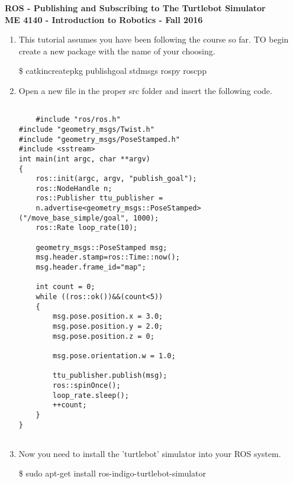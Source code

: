 \documentclass[12pt]{article}
\begin{document}
\thispagestyle{plain}

\begin{center}
   {\bf \Large ROS - Publishing and Subscribing to The Turtlebot Simulator}\vspace{2mm} \\
   {\bf \large ME 4140 - Introduction to Robotics - Fall 2016} \\
\end{center}


\begin{enumerate}
	
	\item This tutorial assumes you have been following the course so far. TO begin create a new package with the name of your choosing.


		{\selectfont  \hspace{5mm} \$ catkin\textunderscore create\textunderscore pkg publish\textunderscore goal std\textunderscore msgs rospy roscpp }
    

	\item Open a new file in the proper src folder and insert the following code. 

     	\begin{lstlisting}

	#include "ros/ros.h"
#include "geometry_msgs/Twist.h"
#include "geometry_msgs/PoseStamped.h"
#include <sstream>
int main(int argc, char **argv)
{
	ros::init(argc, argv, "publish_goal");
	ros::NodeHandle n;
	ros::Publisher ttu_publisher =
	n.advertise<geometry_msgs::PoseStamped>("/move_base_simple/goal", 1000);
	ros::Rate loop_rate(10);

	geometry_msgs::PoseStamped msg;
	msg.header.stamp=ros::Time::now();
	msg.header.frame_id="map";

	int count = 0;
	while ((ros::ok())&&(count<5))  
	{				
		msg.pose.position.x = 3.0;
		msg.pose.position.y = 2.0;
		msg.pose.position.z = 0;

		msg.pose.orientation.w = 1.0;

		ttu_publisher.publish(msg);
		ros::spinOnce();
		loop_rate.sleep();
		++count;
	}
}


\end{lstlisting}
	
    \item Now you need to install the 'turtlebot' simulator into your ROS system.
    
	{\selectfont  \hspace{5mm} \$ sudo apt-get install ros-indigo-turtlebot-simulator }
	

\end{enumerate}
\end{document}
